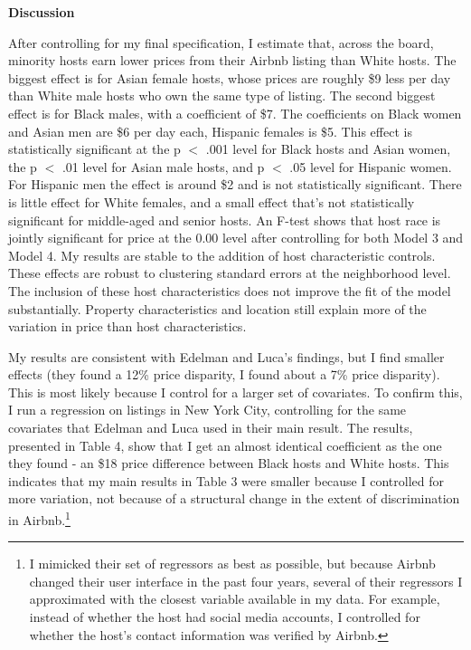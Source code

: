 \documentclass[11pt, oneside]{article}
\begin{document}
\textbf{Discussion}

After controlling for my final specification, I estimate that, across the board, minority hosts earn lower prices from their Airbnb listing than White hosts. The biggest effect is for Asian female hosts, whose prices are roughly \$9 less per day than White male hosts who own the same type of listing. The second biggest effect is for Black males, with a coefficient of \$7. The coefficients on Black women and Asian men are \$6 per day each, Hispanic females is \$5. This effect is statistically significant at the p $<$ .001 level for Black hosts and Asian women, the p $<$ .01 level for Asian male hosts, and p $<$ .05 level for Hispanic women. For Hispanic men the effect is around \$2 and is not statistically significant. There is little effect for White females, and a small effect that's not statistically significant for middle-aged and senior hosts. An F-test shows that host race is jointly significant for price at the 0.00 level after controlling for both Model 3 and Model 4. My results are stable to the addition of host characteristic controls. These effects are robust to clustering standard errors at the neighborhood level. The inclusion of these host characteristics does not improve the fit of the model substantially. Property characteristics and location still explain more of the variation in price than host characteristics. 

My results are consistent with Edelman and Luca's findings, but I find smaller effects (they found a 12\% price disparity, I found about a 7\% price disparity). This is most likely because I control for a larger set of covariates. To confirm this, I run a regression on listings in New York City, controlling for the same covariates that Edelman and Luca used in their main result. The results, presented in Table 4, show that I get an almost identical coefficient as the one they found - an \$18 price difference between Black hosts and White hosts. This indicates that my main results in Table 3 were smaller because I controlled for more variation, not because of a structural change in the extent of discrimination in Airbnb.\footnote{I mimicked their set of regressors as best as possible, but because Airbnb changed their user interface in the past four years, several of their regressors I approximated with the closest variable available in my data. For example, instead of whether the host had social media accounts, I controlled for whether the host's contact information was verified by Airbnb.}
\end{document}
